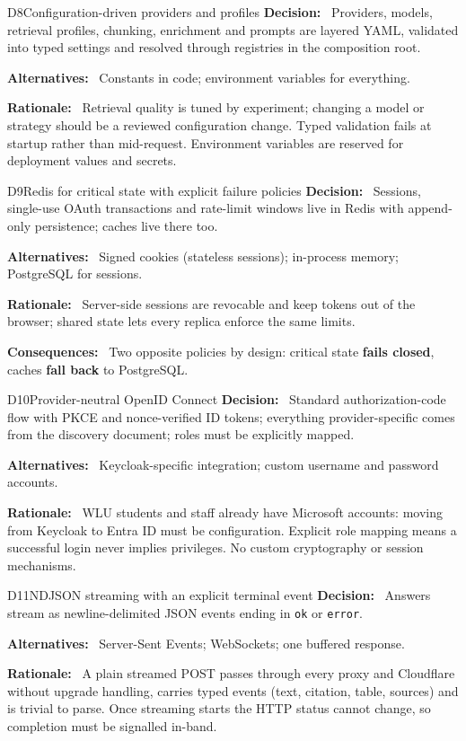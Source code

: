\documentclass[11pt,letterpaper]{report}
\newcommand{\field}[1]{\textbf{\color{lauPurple}#1:}~}
\begin{document}
\begin{decision}{D8}{Configuration-driven providers and profiles}
\field{Decision} Providers, models, retrieval profiles, chunking, enrichment and prompts are layered
YAML, validated into typed settings and resolved through registries in the composition root.\par
\field{Alternatives} Constants in code; environment variables for everything.\par
\field{Rationale} Retrieval quality is tuned by experiment; changing a model or strategy should be a
reviewed configuration change. Typed validation fails at startup rather than mid-request.
Environment variables are reserved for deployment values and secrets.
\end{decision}

\begin{decision}{D9}{Redis for critical state with explicit failure policies}
\field{Decision} Sessions, single-use OAuth transactions and rate-limit windows live in Redis with
append-only persistence; caches live there too.\par
\field{Alternatives} Signed cookies (stateless sessions); in-process memory; PostgreSQL for sessions.\par
\field{Rationale} Server-side sessions are revocable and keep tokens out of the browser; shared state
lets every replica enforce the same limits.\par
\field{Consequences} Two opposite policies by design: critical state \textbf{fails closed}, caches
\textbf{fall back} to PostgreSQL.
\end{decision}

\begin{decision}{D10}{Provider-neutral OpenID Connect}
\field{Decision} Standard authorization-code flow with PKCE and nonce-verified ID tokens; everything
provider-specific comes from the discovery document; roles must be explicitly mapped.\par
\field{Alternatives} Keycloak-specific integration; custom username and password accounts.\par
\field{Rationale} WLU students and staff already have Microsoft accounts: moving from Keycloak to
Entra ID must be configuration. Explicit role mapping means a successful login never implies
privileges. No custom cryptography or session mechanisms.
\end{decision}

\begin{decision}{D11}{NDJSON streaming with an explicit terminal event}
\field{Decision} Answers stream as newline-delimited JSON events ending in \texttt{ok} or \texttt{error}.\par
\field{Alternatives} Server-Sent Events; WebSockets; one buffered response.\par
\field{Rationale} A plain streamed POST passes through every proxy and Cloudflare without upgrade
handling, carries typed events (text, citation, table, sources) and is trivial to parse. Once
streaming starts the HTTP status cannot change, so completion must be signalled in-band.
\end{decision}
\end{document}
